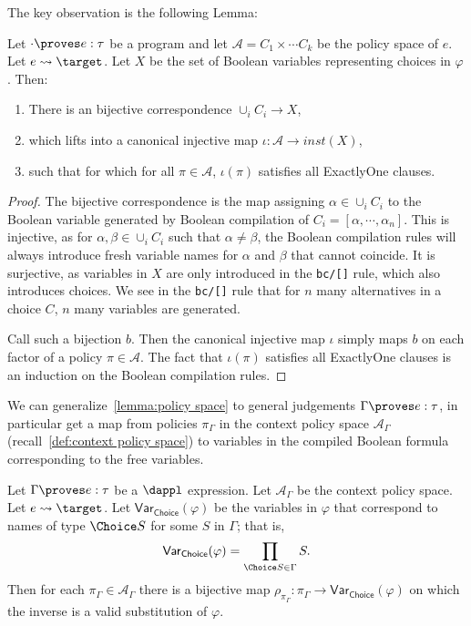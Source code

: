 The key observation is the following Lemma:

\begin{lemma}\label{lemma:policy space}
  Let $\cdot \proves e : \tau$ be a \dappl{} program and 
  let $\mathcal A = C_1 \times \cdots C_k$ 
  be the policy space of $e$. 
  Let $e \leadsto \target$. 
  Let $X$ be the set of Boolean variables
  representing choices in $\varphi$. 
  Then:
  \begin{enumerate}
    \item There is an bijective correspondence $\cup_i C_i \to X$,
    \item which lifts into a canonical injective map $\iota :\mathcal A \to inst(X)$,
    \item such that for which for all $\pi\in \mathcal A$, $\iota(\pi)$ satisfies all
    ExactlyOne clauses.
  \end{enumerate} 
\end{lemma}

\begin{proof}
The bijective correspondence is the map assigning $\alpha \in \cup_i C_i$
  to the Boolean variable generated by 
  Boolean compilation of $C_i = [\alpha, \cdots, \alpha_n]$.
  This is injective, as for $\alpha,\beta \in \cup_i C_i$ such that $\alpha \neq \beta$,
  the Boolean compilation rules will always introduce fresh variable names for $\alpha$
  and $\beta$ that cannot coincide. It is surjective, as variables in $X$ are only 
  introduced in the \texttt{bc/[]} rule, which also introduces choices. We see in the 
  \texttt{bc/[]} rule that for $n$ many alternatives in a choice $C$, $n$ many variables
  are generated.

  Call such a bijection $b$. Then the canonical injective map $\iota$ simply maps $b$
  on each factor of a policy $\pi \in \mathcal A$. The fact that 
  $\iota(\pi)$ satisfies all ExactlyOne clauses is an induction on the Boolean
  compilation rules.
\end{proof}

We can generalize~\cref{lemma:policy space} to general judgements $\Gamma \proves e : \tau$,
in particular get a map from policies $\pi_{\Gamma}$ 
in the context policy space $\mathcal{A}_{\Gamma}$ (recall~\cref{def:context policy space})
to variables in the compiled Boolean formula corresponding to the free variables.

\begin{lemma}\label{lemma:context policy space}
  Let $\Gamma \proves e : \tau$ be a $\dappl$ expression.
  Let $\mathcal{A}_{\Gamma}$ be the context policy space. 
  Let $e \leadsto \target$.
  Let $\mathsf{Var}_{\mathsf{Choice}}(\varphi)$
  be the variables in $\varphi$ that correspond to names of type 
  $\Choice S$ for some $S$ in $\Gamma$; that is,
  $$
  \mathsf{Var}_{\mathsf{Choice}}(\varphi) = \prod_{\Choice S \in \Gamma} S.
  $$
  Then for each $\pi_{\Gamma} \in \mathcal{A}_{\Gamma}$ there is a bijective map $\rho_{\pi_{\Gamma}}:  \pi_{\Gamma} \to \mathsf{Var}_{\mathsf{Choice}}(\varphi)$ 
  on which the inverse is a valid substitution of $\varphi$.
\end{lemma}


